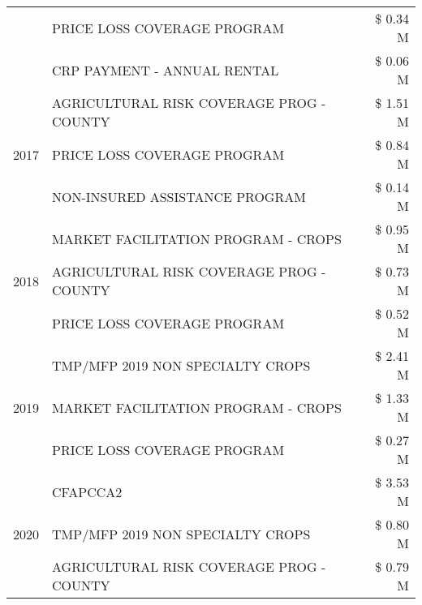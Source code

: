 \begin{tabular}{llr}
 & PRICE LOSS COVERAGE PROGRAM & \$ 0.34 M \\
 & CRP PAYMENT - ANNUAL RENTAL & \$ 0.06 M \\
\cline{1-3}
\multirow[t]{3}{*}{2017} & AGRICULTURAL RISK COVERAGE PROG - COUNTY & \$ 1.51 M \\
 & PRICE LOSS COVERAGE PROGRAM & \$ 0.84 M \\
 & NON-INSURED ASSISTANCE PROGRAM & \$ 0.14 M \\
\cline{1-3}
\multirow[t]{3}{*}{2018} & MARKET FACILITATION PROGRAM - CROPS & \$ 0.95 M \\
 & AGRICULTURAL RISK COVERAGE PROG - COUNTY & \$ 0.73 M \\
 & PRICE LOSS COVERAGE PROGRAM & \$ 0.52 M \\
\cline{1-3}
\multirow[t]{3}{*}{2019} & TMP/MFP 2019 NON SPECIALTY CROPS & \$ 2.41 M \\
 & MARKET FACILITATION PROGRAM - CROPS & \$ 1.33 M \\
 & PRICE LOSS COVERAGE PROGRAM & \$ 0.27 M \\
\cline{1-3}
\multirow[t]{3}{*}{2020} & CFAPCCA2 & \$ 3.53 M \\
 & TMP/MFP 2019 NON SPECIALTY CROPS & \$ 0.80 M \\
 & AGRICULTURAL RISK COVERAGE PROG - COUNTY & \$ 0.79 M \\
\cline{1-3}
\bottomrule
\end{tabular}
